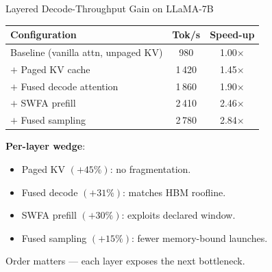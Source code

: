 \documentclass[10pt,aspectratio=169]{beamer}
\begin{document}
\begin{frame}{Layered Decode-Throughput Gain on LLaMA-7B}
  \scriptsize
  \begin{tabular}{@{}lcc@{}}
    \toprule
    \textbf{Configuration} & \textbf{Tok/s} & \textbf{Speed-up}\\
    \midrule
    Baseline (vanilla attn, unpaged KV)  &    980 & 1.00$\times$\\
    \;$+$ Paged KV cache                  & 1\,420 & 1.45$\times$\\
    \;$+$ Fused decode attention          & 1\,860 & 1.90$\times$\\
    \;$+$ SWFA prefill                    & 2\,410 & 2.46$\times$\\
    \;$+$ Fused sampling                  & 2\,780 & \alert{2.84$\times$}\\
    \bottomrule
  \end{tabular}
  \vspace{2ex}

  \normalsize
  \textbf{Per-layer wedge}:
  \begin{itemize}\footnotesize
    \item Paged KV $(+45\%)$: no fragmentation.
    \item Fused decode $(+31\%)$: matches HBM roofline.
    \item SWFA prefill $(+30\%)$: exploits declared window.
    \item Fused sampling $(+15\%)$: fewer memory-bound launches.
  \end{itemize}
  \alert{Order matters} — each layer exposes the next bottleneck.
\end{frame}
\end{document}
